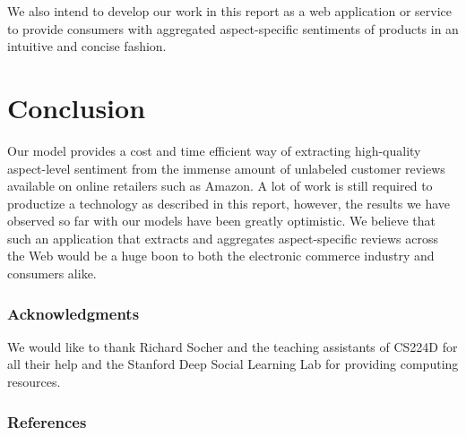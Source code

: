 \documentclass{article} %
\begin{document}
We also intend to develop our work in this report as a web application or service to provide consumers with aggregated aspect-specific sentiments of products in an intuitive and concise fashion.

\section{Conclusion}

Our model provides a cost and time efficient way of extracting high-quality aspect-level sentiment from the immense amount of unlabeled customer reviews available on online retailers such as Amazon. A lot of work is still required to productize a technology as described in this report, however, the results we have observed so far with our models have been greatly optimistic.  We believe that such an application that extracts and aggregates aspect-specific reviews across the Web would be a huge boon to both the electronic commerce industry and consumers alike.

\subsubsection*{Acknowledgments}

We would like to thank Richard Socher and the teaching assistants of CS224D for all their help and the Stanford Deep Social Learning Lab for providing computing resources.

\subsubsection*{References} %
\end{document}
